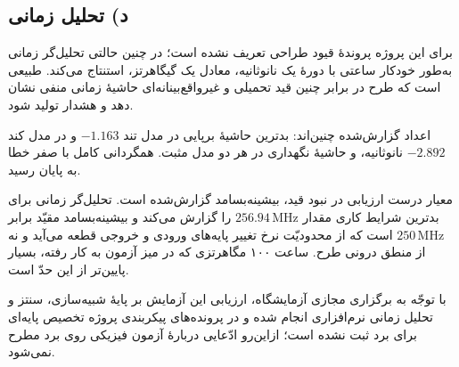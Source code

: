 \documentclass[12pt,a4paper]{article}
\begin{document}

	\subsection*{د) تحلیل زمانی}
	برای این پروژه پروندهٔ قیود طراحی تعریف نشده است؛ در چنین حالتی تحلیل‌گر زمانی به‌طور خودکار ساعتی با دورهٔ یک نانوثانیه، معادل یک گیگاهرتز، استنتاج می‌کند. طبیعی است که طرح در برابر چنین قید تحمیلی و غیرواقع‌بینانه‌ای حاشیهٔ زمانی منفی نشان دهد و هشدار  تولید شود.


	اعداد گزارش‌شده چنین‌اند: بدترین حاشیهٔ برپایی در مدل تند \(-1.163\) و در مدل کند \(-2.892\) نانوثانیه، و حاشیهٔ نگهداری در هر دو مدل مثبت. همگردانی کامل با صفر خطا به پایان رسید.

	معیار درست ارزیابی در نبود قید، بیشینه‌بسامد گزارش‌شده است. تحلیل‌گر زمانی برای بدترین شرایط کاری مقدار \(256.94\,\mathrm{MHz}\) را گزارش می‌کند و بیشینه‌بسامد مقیّد برابر \(250\,\mathrm{MHz}\) است که از محدودیّت نرخ تغییر پایه‌های ورودی و خروجی قطعه می‌آید و نه از منطق درونی طرح. ساعت ۱۰۰ مگاهرتزی که در میز آزمون به کار رفته، بسیار پایین‌تر از این حدّ است.

	با توجّه به برگزاری مجازی آزمایشگاه، ارزیابی این آزمایش بر پایهٔ شبیه‌سازی، سنتز و تحلیل زمانی نرم‌افزاری انجام شده و در پرونده‌های پیکربندی پروژه تخصیص پایه‌ای برای برد ثبت نشده است؛ ازاین‌رو ادّعایی دربارهٔ آزمون فیزیکی روی برد مطرح نمی‌شود.
\end{document}
